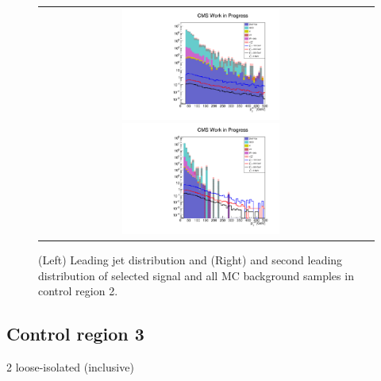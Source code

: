\begin{figure}[tbh!]
	\centering
	\begin{tabular}{cc}
		\includegraphics[width=0.5\textwidth]{analysis/pics/h_jet1pt_Tau2TightIsoVBFInverted.pdf}
		\includegraphics[width=0.5\textwidth]{analysis/pics/h_tau2pt_Tau2TightIsoVBFInverted.pdf} 		
	\end{tabular}
	\caption{(Left) Leading jet \pt distribution and (Right) and second leading \hadtau \pt distribution of selected signal and all MC background samples in control region 2.}
	\label{fig::crplots2_Taui2TightIsoVBFInverted_13tev}
\end{figure}

\subsection*{Control region 3}

\FloatBarrier

2 loose-isolated \hadtau (inclusive)

